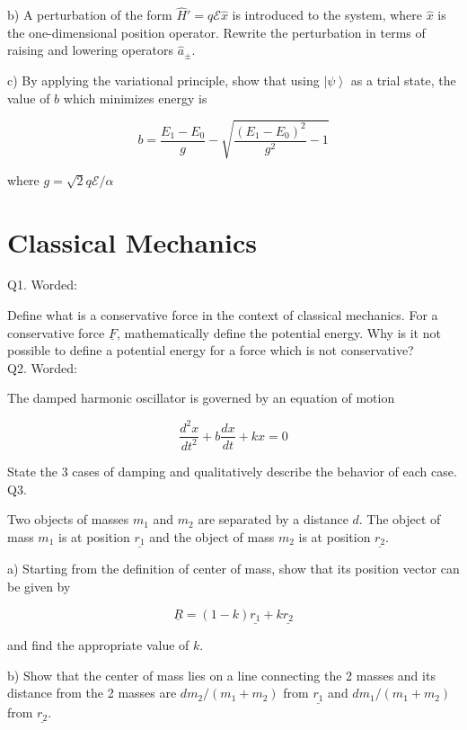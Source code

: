 \documentclass[a4paper,11pt]{article}
\begin{document}
\medskip

b) A perturbation of the form \( \hat{H}' = q \mathcal{E} \hat{x} \) is introduced to the system, where \( \hat{x} \) is the one-dimensional position operator. Rewrite the perturbation in terms of raising and lowering operators \( \hat{a}_{\pm} \).

\medskip

c) By applying the variational principle, show that using \( \left| \psi \right> \) as a trial state, the value of \( b \) which minimizes energy is 

\[ b = \frac{E_{1} - E_{0}}{g} - \sqrt{\frac{(E_{1} - E_{0})^{2}}{g^{2}} -1} \]

where \( g = \sqrt{2} q \mathcal{E} / {\alpha} \)

\section{Classical Mechanics}

Q1. Worded:

Define what is a conservative force in the context of classical mechanics. For a conservative force \( \underline{F} \), mathematically define the potential energy. Why is it not possible to define a potential energy for a force which is not conservative? \\

Q2. Worded:

The damped harmonic oscillator is governed by an equation of motion

\[
\frac{d^{2}x}{dt^{2}} + b\frac{dx}{dt}+kx=0
\]

State the 3 cases of damping and qualitatively describe the behavior of each case. \\

Q3. 

Two objects of masses \( m_{1} \) and \( m_{2} \) are separated by a distance \( d \). The object of mass \( m_{1} \) is at position \( \underline{r_{1}} \) and the object of mass \( m_{2} \) is at position \( \underline{r_{2}} \).

\medskip

a) Starting from the definition of center of mass, show that its position vector can be given by 

\[ \underline{R} = (1-k)\underline{r_{1}} + k\underline{r_{2}} \]

and find the appropriate value of \( k \). 

\medskip

b) Show that the center of mass lies on a line connecting the 2 masses and its distance from the 2 masses are \( d m_{2}/(m_{1}+m_{2}) \) from \( \underline{r_{1}} \) and \( d m_{1}/(m_{1}+m_{2}) \) from \( \underline{r_{2}} \). \\
\end{document}
